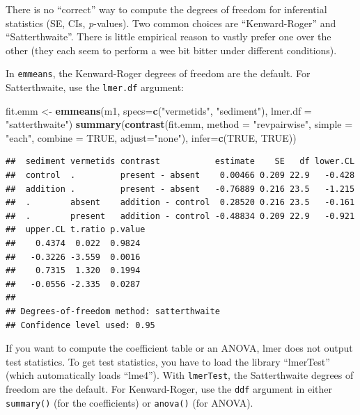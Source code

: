 \documentclass[]{book}
\newenvironment{Shaded}{\begin{snugshade}}{\end{snugshade}}
\newcommand{\DataTypeTok}[1]{\textcolor[rgb]{0.13,0.29,0.53}{#1}}
\newcommand{\KeywordTok}[1]{\textcolor[rgb]{0.13,0.29,0.53}{\textbf{#1}}}
\newcommand{\NormalTok}[1]{#1}
\newcommand{\OtherTok}[1]{\textcolor[rgb]{0.56,0.35,0.01}{#1}}
\newcommand{\StringTok}[1]{\textcolor[rgb]{0.31,0.60,0.02}{#1}}
\begin{document}
There is no ``correct'' way to compute the degrees of freedom for inferential statistics (SE, CIs, \emph{p}-values). Two common choices are ``Kenward-Roger'' and ``Satterthwaite''. There is little empirical reason to vastly prefer one over the other (they each seem to perform a wee bit bitter under different conditions).

In \texttt{emmeans}, the Kenward-Roger degrees of freedom are the default. For Satterthwaite, use the \texttt{lmer.df} argument:

\begin{Shaded}
\begin{Highlighting}[]
\NormalTok{fit.emm <-}\StringTok{ }\KeywordTok{emmeans}\NormalTok{(m1, }
                   \DataTypeTok{specs=}\KeywordTok{c}\NormalTok{(}\StringTok{"vermetids"}\NormalTok{, }\StringTok{"sediment"}\NormalTok{),}
                   \DataTypeTok{lmer.df =} \StringTok{"satterthwaite"}\NormalTok{)}
\KeywordTok{summary}\NormalTok{(}\KeywordTok{contrast}\NormalTok{(fit.emm, }
                 \DataTypeTok{method =} \StringTok{"revpairwise"}\NormalTok{, }
                 \DataTypeTok{simple =} \StringTok{"each"}\NormalTok{,}
                 \DataTypeTok{combine =} \OtherTok{TRUE}\NormalTok{,}
                 \DataTypeTok{adjust=}\StringTok{"none"}\NormalTok{),}
        \DataTypeTok{infer=}\KeywordTok{c}\NormalTok{(}\OtherTok{TRUE}\NormalTok{, }\OtherTok{TRUE}\NormalTok{))}
\end{Highlighting}
\end{Shaded}

\begin{verbatim}
##  sediment vermetids contrast           estimate    SE   df lower.CL
##  control  .         present - absent    0.00466 0.209 22.9   -0.428
##  addition .         present - absent   -0.76889 0.216 23.5   -1.215
##  .        absent    addition - control  0.28520 0.216 23.5   -0.161
##  .        present   addition - control -0.48834 0.209 22.9   -0.921
##  upper.CL t.ratio p.value
##    0.4374  0.022  0.9824 
##   -0.3226 -3.559  0.0016 
##    0.7315  1.320  0.1994 
##   -0.0556 -2.335  0.0287 
## 
## Degrees-of-freedom method: satterthwaite 
## Confidence level used: 0.95
\end{verbatim}

If you want to compute the coefficient table or an ANOVA, lmer does not output test statistics. To get test statistics, you have to load the library ``lmerTest'' (which automatically loads ``lme4''). With \texttt{lmerTest}, the Satterthwaite degrees of freedom are the default. For Kenward-Roger, use the \texttt{ddf} argument in either \texttt{summary()} (for the coefficients) or \texttt{anova()} (for ANOVA).
\end{document}
